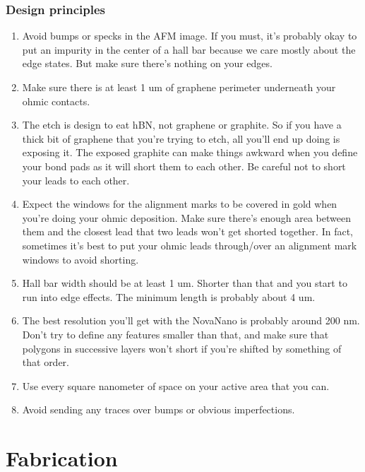 \begin{appendices}
\subsubsection{Design principles}
\begin{enumerate}
	\item Avoid bumps or specks in the AFM image. If you must, it’s probably okay to put an impurity in the center of a hall bar because we care mostly about the edge states. But make sure there’s nothing on your edges.
	\item Make sure there is at least 1 um of graphene perimeter underneath your ohmic contacts. 
	\item The etch is design to eat hBN, not graphene or graphite. So if you have a thick bit of graphene that you’re trying to etch, all you’ll end up doing is exposing it. The exposed graphite can make things awkward when you define your bond pads as it will short them to each other. Be careful not to short your leads to each other.
	\item Expect the windows for the alignment marks to be covered in gold when you’re doing your ohmic deposition. Make sure there’s enough area between them and the closest lead that two leads won’t get shorted together. In fact, sometimes it’s best to put your ohmic leads through/over an alignment mark windows to avoid shorting.
	\item Hall bar width should be at least 1 um. Shorter than that and you start to run into edge effects. The minimum length is probably about 4 um.
	\item The best resolution you’ll get with the NovaNano is probably around 200 nm. Don’t try to define any features smaller than that, and make sure that polygons in successive layers won’t short if you’re shifted by something of that order.
	\item Use every square nanometer of space on your active area that you can.
	\item Avoid sending any traces over bumps or obvious imperfections.
\end{enumerate}

\section{Fabrication}


\end{appendices}
